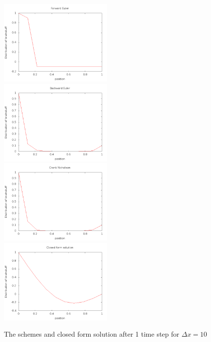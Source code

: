\documentclass[a4wide,12pt]{article}
\begin{document}
\begin{figure}[hbtp]
	\includegraphics[width=0.5\textwidth]{Forwarddx101}
	\includegraphics[width=0.5\textwidth]{Backwarddx101}
	\includegraphics[width=0.5\textwidth]{Crankdx101}
	\includegraphics[width=0.5\textwidth]{Closedform1}
	\caption{The schemes and closed form solution after 1 time step for $\Delta x = 10$}
	\label{fig:01}
\end{figure}
\end{document}

